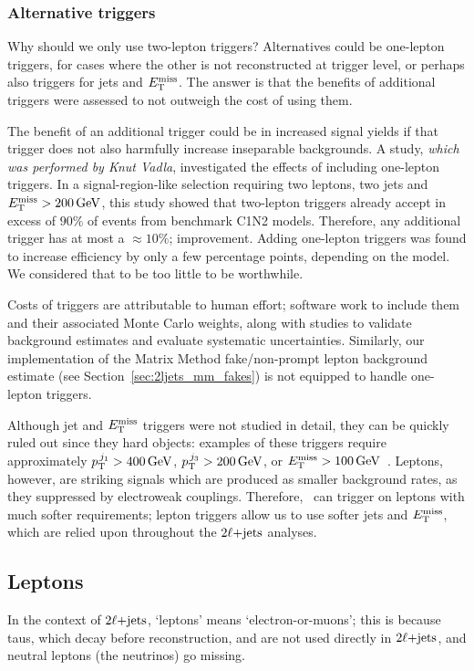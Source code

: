 \subsubsection{Alternative triggers}
Why should we only use two-lepton triggers?
Alternatives could be one-lepton triggers, for cases where the other is not
reconstructed at trigger level, or perhaps also triggers for jets and $\met$.
The answer is that the benefits of additional triggers were assessed to not
outweigh the cost of using them.

The benefit of an additional trigger could be in increased signal yields if
that trigger does not also harmfully increase inseparable backgrounds.
A study, \emph{which was performed by Knut Vadla}, investigated the effects
of including one-lepton triggers.
In a signal-region-like selection requiring two leptons, two jets and
$\met > 200\,\eV[G]$, this study showed that two-lepton triggers already accept
in excess of $90\%$ of events from benchmark C1N2 models.
Therefore, any additional trigger has at most a $\approx10\%$;
improvement. Adding one-lepton triggers was found to increase efficiency by
only a few percentage points, depending on the model.
We considered that to be too little to be worthwhile.

Costs of triggers are attributable to human effort;
software work to include them and their associated Monte Carlo weights, along
with studies to validate background estimates and evaluate systematic
uncertainties.
Similarly, our implementation of the Matrix Method fake/non-prompt lepton
background estimate (see Section~\ref{sec:2ljets_mm_fakes}) is not equipped to
handle one-lepton triggers.

Although jet and $\met$ triggers were not studied in detail, they can be
quickly ruled out since they hard objects: examples of these triggers require
approximately $\ptjone > 400\,\eV[G]$, $p_\mathrm{T}^{\,j_3} > 200\,\eV[G]$, or
$\met > 100\,\eV[G]$~\cite{atlas_twiki_lowest_unprescaled}.
Leptons, however, are striking signals which are produced as smaller background
rates, as they suppressed by electroweak couplings.
Therefore, \atlas\ can trigger on leptons with much softer requirements;
lepton triggers allow us to use softer jets and $\met$, which are relied upon
throughout the $\twoljets$ analyses.


\subsection{Leptons}
In the context of $\twoljets$, `leptons' means `electron-or-muons';
this is because taus, which decay before reconstruction, and are not used
directly in $\twoljets$, and neutral leptons (the neutrinos) go missing.

